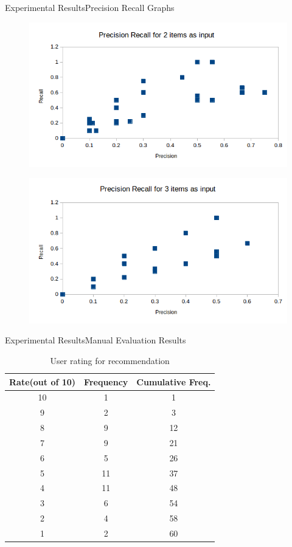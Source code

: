 \documentclass[10pt]{beamer}
\begin{document}
\begin{frame}{Experimental Results}{Precision Recall Graphs}
\begin{figure}[htb]
\centering
\includegraphics[scale=0.4]{g22}
\label{fig:g2}
\end{figure}
\begin{figure}[htb]
\centering
\includegraphics[scale=0.4]{g33}
\label{fig:g3}
\end{figure}
\end{frame}

\begin{frame}{Experimental Results}{Manual Evaluation Results}
\begin{table}
\centering
\caption{User rating for recommendation}
\begin{tabular}{|c|c|c|}
\hline
Rate(out of 10) & Frequency & Cumulative Freq.\\
\hline\hline
10 & 1 & 1\\
9 & 2 & 3\\
8 & 9 & 12\\
7 & 9 & 21\\
6 & 5 & 26\\
5 & 11 & 37\\
4 & 11 & 48\\
3 & 6 & 54\\
2 & 4 & 58\\
1 & 2 & 60\\
\hline\end{tabular}
\label{table:userRating}
\end{table}

\end{frame}
\end{document}
